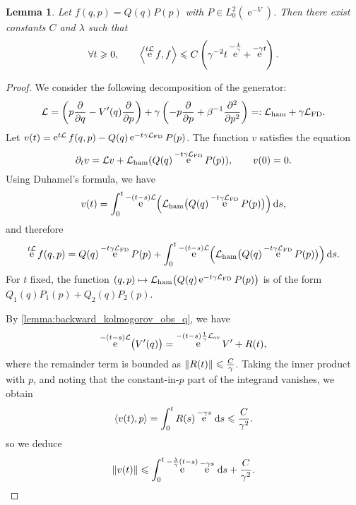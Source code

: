 \documentclass[11pt,a4paper]{article}
\DeclareMathOperator{\e}{e}
\renewcommand{\d}{\mathrm d}
\theoremstyle{plain}
\newtheorem{lemma}{Lemma}[section]
\numberwithin{equation}{section}
\renewcommand{\leq}{\leqslant}
\renewcommand{\geq}{\geqslant}
\begin{document}
\begin{lemma}
    Let $f(q, p) = Q(q) P(p)$ with $P \in L^2_0(\e^{-V})$.
    Then there exist constants $C$ and $\lambda$ such that
    \[
        \forall t \geq 0, \qquad
        \ip{\e^{t \mathcal L}f}{f} \leq C \left( \gamma^{-2} t \e^{- \frac{t}{\gamma}} + \e^{-\gamma t} \right).
    \]
\end{lemma}
\begin{proof}
    We consider the following decomposition of the generator:
    \[
        \mathcal L
        = \left( p \derivative{1}{q} - \derivative*{1}[V]{q}(q) \derivative{1}{p} \right)
        + \gamma \left( - p \derivative{1}{p} + \beta^{-1} \derivative{2}{p^2} \right)
        =: \mathcal L_{\rm ham} + \gamma \mathcal L_{\rm FD}.
    \]
    Let $v(t) = \e^{t \mathcal L} f(q, p) - Q(q) \e^{- t \gamma \mathcal L_{\rm FD}} P(p)$.
    The function $v$ satisfies the equation
    \[
        \partial_t v = \mathcal L v +  \mathcal L_{\rm ham} (Q(q) \e^{- t \gamma \mathcal L_{\rm FD}} P(p)), \qquad v(0) = 0.
    \]
    Using Duhamel's formula, we have
    \[
        v(t) = \int_{0}^{t} \e^{- (t-s) \mathcal L}  \Bigl( \mathcal L_{\rm ham} \bigl(Q(q) \e^{- t \gamma \mathcal L_{\rm FD}} P(p)\bigr) \Bigr) \, \d s,
    \]
    and therefore
    \begin{equation}
        \label{eq:intermediate_decay_correlation}
        \e^{t \mathcal L} f(q,p) = Q(q) \e^{- t \gamma \mathcal L_{\rm FD}} P(p) + \int_{0}^{t} \e^{- (t-s) \mathcal L}  \Bigl( \mathcal L_{\rm ham} \bigl(Q(q) \e^{- t \gamma \mathcal L_{\rm FD}} P(p)\bigr) \Bigr) \, \d s.
    \end{equation}
    For $t$ fixed, the function $(q, p) \mapsto \mathcal L_{\rm ham} \bigl(Q(q) \e^{- t \gamma \mathcal L_{\rm FD}} P(p)\bigr)$ is of the form $Q_1(q) P_1(p)+ Q_2(q) P_2(p)$.

    By \cref{lemma:backward_kolmogorov_obs_q},
    we have
    \[
        \e^{- (t-s) \mathcal L} \bigl(V'(q)\bigr)
        = \e^{- (t-s) \frac{1}{\gamma}\mathcal L_{\rm ov}} V' + R(t),
    \]
    where the remainder term is bounded as $\norm{R(t)} \leq \frac{C}{\gamma}$.
    Taking the inner product with $p$,
    and noting that the constant-in-$p$ part of the integrand vanishes,
    we obtain
    \[
        \ip{v(t)}{p} = \int_{0}^{t} R(s) \e^{-\gamma s} \, \d s
        \leq \frac{C}{\gamma^2}.
    \]
    so we deduce
    \[
        \norm{v(t)} \leq \int_{0}^{t} \e^{- \frac{\lambda}{\gamma}(t-s)} \e^{- \gamma s} \, \d s + \frac{C}{\gamma^2}.
    \]
\end{proof}
\end{document}
